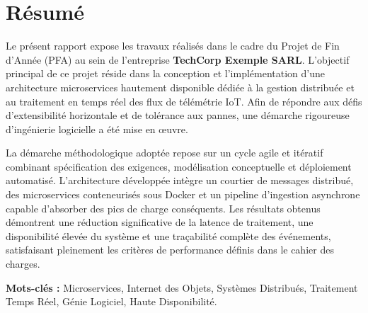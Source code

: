 \chapter*{R\'esum\'e}

\noindent
Le pr\'esent rapport expose les travaux r\'ealis\'es dans le cadre du Projet de Fin d'Ann\'ee (PFA) au sein de l'entreprise \textbf{TechCorp Exemple SARL}. L'objectif principal de ce projet r\'eside dans la conception et l'impl\'ementation d'une architecture microservices hautement disponible d\'edi\'ee \`a la gestion distribu\'ee et au traitement en temps r\'eel des flux de t\'el\'em\'etrie IoT. Afin de r\'epondre aux d\'efis d'extensibilit\'e horizontale et de tol\'erance aux pannes, une d\'emarche rigoureuse d'ing\'enierie logicielle a \'et\'e mise en \oe uvre.

\vspace{0.4cm}

\noindent
La d\'emarche m\'ethodologique adopt\'ee repose sur un cycle agile et it\'eratif combinant sp\'ecification des exigences, mod\'elisation conceptuelle et d\'eploiement automatis\'e. L'architecture d\'evelopp\'ee int\`egre un courtier de messages distribu\'e, des microservices conteneuris\'es sous Docker et un pipeline d'ingestion asynchrone capable d'absorber des pics de charge cons\'equents. Les r\'esultats obtenus d\'emontrent une r\'eduction significative de la latence de traitement, une disponibilit\'e \'elev\'ee du syst\`eme et une tra\c{c}abilit\'e compl\`ete des \'ev\'enements, satisfaisant pleinement les crit\`eres de performance d\'efinis dans le cahier des charges.

\vspace{0.8cm}

\noindent
\textbf{Mots-cl\'es :} Microservices, Internet des Objets, Syst\`emes Distribu\'es, Traitement Temps R\'eel, G\'enie Logiciel, Haute Disponibilit\'e.
